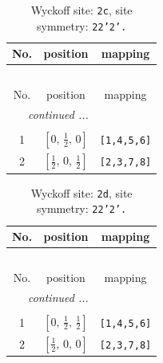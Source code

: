 \documentclass[fleqn,8pt]{jsarticle}
\begin{document}
\renewcommand{\arraystretch}{1.2}
\begin{longtable}{ccc}
\caption{Wyckoff site: {\tt 2c}, site symmetry: {\tt 22'2'.}}
 \\
 \hline \hline
No. & position & mapping \\ \hline \endfirsthead

\multicolumn{2}{l}{\tablename\ \thetable{}} \\
 \hline \hline
No. & position & mapping \\ \hline \endhead

 \hline \hline
\multicolumn{2}{r}{\footnotesize\it continued ...} \\ \endfoot

 \hline \hline
\multicolumn{2}{r}{} \\ \endlastfoot

1 & $\left[ 0,\, \frac{1}{2},\, 0 \right]$ & {\tt [1,4,5,6]} \\ \hline
2 & $\left[ \frac{1}{2},\, 0,\, \frac{1}{2} \right]$ & {\tt [2,3,7,8]} \\
\end{longtable}
\renewcommand{\arraystretch}{1.2}
\begin{longtable}{ccc}
\caption{Wyckoff site: {\tt 2d}, site symmetry: {\tt 22'2'.}}
 \\
 \hline \hline
No. & position & mapping \\ \hline \endfirsthead

\multicolumn{2}{l}{\tablename\ \thetable{}} \\
 \hline \hline
No. & position & mapping \\ \hline \endhead

 \hline \hline
\multicolumn{2}{r}{\footnotesize\it continued ...} \\ \endfoot

 \hline \hline
\multicolumn{2}{r}{} \\ \endlastfoot

1 & $\left[ 0,\, \frac{1}{2},\, \frac{1}{2} \right]$ & {\tt [1,4,5,6]} \\ \hline
2 & $\left[ \frac{1}{2},\, 0,\, 0 \right]$ & {\tt [2,3,7,8]} \\
\end{longtable}
\renewcommand{\arraystretch}{1.2}
\end{document}
